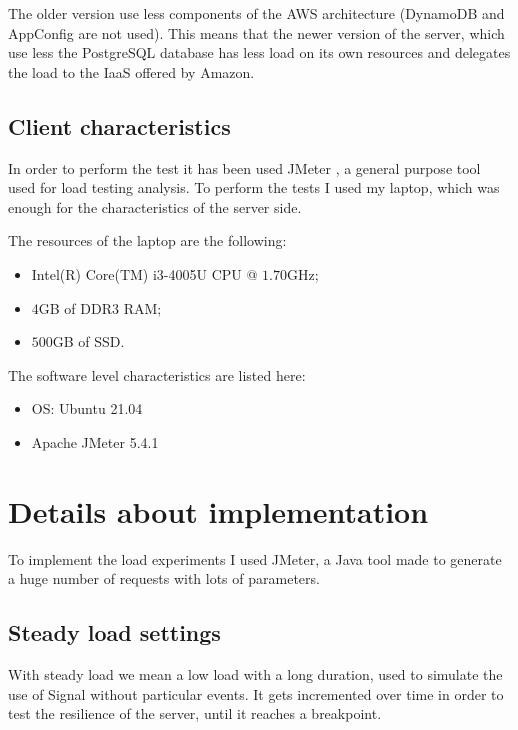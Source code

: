 The older version use less components of the AWS architecture (DynamoDB and AppConfig are not used). This means that the newer version of the server, which use less the PostgreSQL database has less load on its own resources and delegates the load to the IaaS offered by Amazon.



\subsection{Client characteristics\label{sec:clientcharacteristics}}

In order to perform the test it has been used JMeter \parencite{apache_jmeter}, a general purpose tool used for load testing analysis.
To perform the tests I used my laptop, which was enough for the characteristics of the server side.

The resources of the laptop are the following:
\begin{itemize}
    \item Intel(R) Core(TM) i3-4005U CPU @ $1.70$GHz;
    \item $4$GB of DDR3 RAM;
    \item $500$GB of SSD.
\end{itemize}

The software level characteristics are listed here:
\begin{itemize}
    \item OS: Ubuntu 21.04
    \item Apache JMeter 5.4.1
\end{itemize}

\section{Details about implementation\label{sec:implementation}}

To implement the load experiments I used JMeter, a Java tool made to generate a huge number of requests with lots of parameters.

\subsection{Steady load settings\label{sec:baseloadsettings}}

With steady load we mean a low load with a long duration, used to simulate the use of Signal without particular events.
It gets incremented over time in order to test the resilience of the server, until it reaches a breakpoint.

